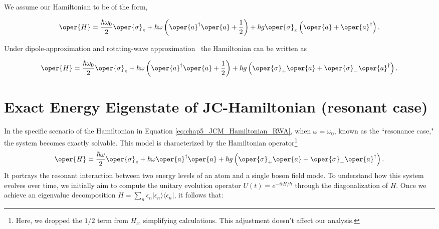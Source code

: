 We assume our Hamiltonian to be of the form,

\begin{mdframed}
\begin{eqnarray}
        \label{eq:chap5_JCM_Hamiltonian}
        \oper{H} = \frac{\hbar \omega_0}{2} \oper{\sigma}_z + \hbar \omega \left(\oper{a}^\dagger \oper{a} + \frac{1}{2}\right) 
        + \hbar g \oper{\sigma}_x\left(\oper{a} + \oper{a}^\dagger\right). 
\end{eqnarray}
\end{mdframed}


Under dipole-approximation and rotating-wave approximation~\cite[Chap 2]{Bina_JC_tutorial} the Hamiltonian can be written as
\begin{mdframed}
\begin{equation}
        \label{eq:chap5_JCM_Hamiltonian_RWA}
        \oper{H} = \frac{\hbar \omega_0}{2} \oper{\sigma}_z + \hbar \omega \left(\oper{a}^\dagger \oper{a} + \frac{1}{2}\right) 
        + \hbar g \left(\oper{\sigma}_+ \oper{a} + \oper{\sigma}_- \oper{a}^\dagger\right).
\end{equation}
\end{mdframed}

\section[Exact Energy Eigenstate of JC-Hamiltonian]{Exact Energy Eigenstate of JC-Hamiltonian (resonant case)}

In the specific scenario of the Hamiltonian in Equation \ref{eq:chap5_JCM_Hamiltonian_RWA}, when 
\(\omega  = \omega_0\), known as the 
``resonance case," the system becomes exactly solvable.
This model is characterized by the Hamiltonian operator\footnote{Here, we dropped the \(1/2\) term from \(H_c\), 
simplifying calculations. This adjustment doesn't affect our analysis.}
\begin{equation}
        \label{eq:chap5_JCM_Hamiltonian_resonance}
        \oper{H} = \frac{\hbar\omega}{2} \oper{\sigma}_z + \hbar \omega \oper{a}^\dagger \oper{a}
        + \hbar g \left(\oper{\sigma}_+ \oper{a} + \oper{\sigma}_- \oper{a}^\dagger\right). 
\end{equation}
It portrays the resonant interaction between two energy levels of an atom and a single boson field mode.
To understand how this system evolves over time, we initially aim to compute the unitary evolution operator 
$U(t) = e^{-i t H/\hbar}$ through the diagonalization of $H$. Once we achieve an eigenvalue decomposition 
$H = \sum_n \epsilon_n \lvert \epsilon_n \rangle \langle \epsilon_n \rvert$, it follows that:

